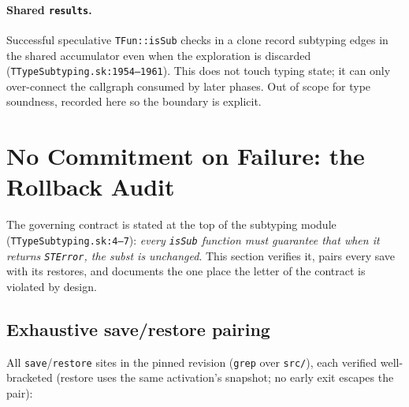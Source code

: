 \documentclass[11pt]{article}
\begin{document}
\paragraph{Shared \texttt{results}.} Successful speculative
\texttt{TFun::isSub} checks in a clone record subtyping edges in the shared
accumulator even when the exploration is discarded
(\texttt{TTypeSubtyping.sk:1954--1961}). This does not touch typing
state; it can only over-connect the callgraph consumed by later phases.
Out of scope for type soundness, recorded here so the boundary is
explicit.

\section{No Commitment on Failure: the Rollback Audit}
\label{sec:rollback}

The governing contract is stated at the top of the subtyping module
(\texttt{TTypeSubtyping.sk:4--7}): \emph{every \texttt{isSub} function
must guarantee that when it returns \texttt{STError}, the subst is
unchanged}. This section verifies it, pairs every save with its restores,
and documents the one place the letter of the contract is violated by
design.

\subsection{Exhaustive save/restore pairing}

All \texttt{save}/\texttt{restore} sites in the pinned revision
(\texttt{grep} over \texttt{src/}), each verified well-bracketed
(restore uses the same activation's snapshot; no early exit escapes the
pair):
\end{document}

